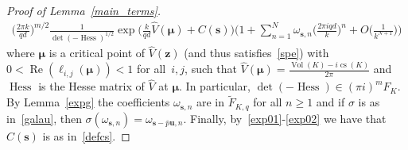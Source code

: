 \documentclass[11pt]{amsart}
\newcommand{\Hess}{\operatorname{Hess}}
\theoremstyle{definition}
\DeclareMathOperator{\Vol}{Vol}
\DeclareMathOperator{\cs}{cs}
\newcommand{\bs}{\boldsymbol }
\renewcommand\Re{\operatorname{Re}}
\newcommand{\1}{{\mathbf 1}}
\numberwithin{equation}{section}
\begin{document}
\begin{proof}[Proof of Lemma~\ref{main_terms}]
  \begin{align*}
    \Big(\frac{2\pi k}{ qd}\Big)^{m/2}\frac1{\det(-\Hess)^{1/2}}
    \exp\Big(\frac{k}{qd} \hat  V(\bs \mu)+C(\bs s)\Big)\bigg(1+\sum_{n=1}^N\omega_{\bs s,n}\big(\frac{2\pi i qd}{k}\Big)^n+O\Big(\frac{1}{k^{N+1}}\Big)\bigg)
  \end{align*}
  where $\bs\mu$ is a critical point of $\hat V(\bs z)$ (and thus satisfies~\eqref{spe}) with $0<\Re(\ell_{i,j}(\bs\mu))<1$ for all~$i,j$, such that $\hat V(\bs \mu)=\frac{\Vol(K)-i\cs(K)}{2\pi }$  
  and $\Hess$ is the Hesse matrix of $\hat V$ at $\bm\mu$. In particular, $\det(-\Hess)\in (\pi i)^m F_{K}$. By Lemma~\ref{expg} the coefficients $\omega_{\bs s,n}$ are in ${\tilde F}_{K, q}$ for all $n\geq1$ and if $\sigma$ is as in~\eqref{galau}, then $\sigma(\omega_{\bs s,n})=\omega_{\bs s-\overline p\bs u,n}$. Finally, by~\eqref{exp01}-\eqref{exp02} we have that $C(\bs s)$ is as in~\eqref{defcs}.
\end{proof}
\end{document}
